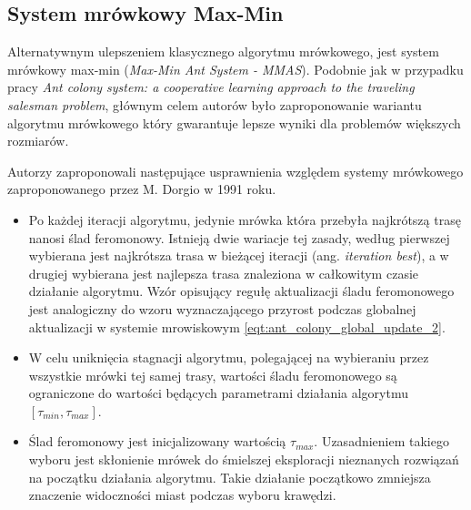 {{        %
        \subsection{System mrówkowy Max-Min}
        {
            Alternatywnym ulepszeniem klasycznego algorytmu mrówkowego, jest system mrówkowy max-min (\textit{Max-Min
            Ant System - MMAS})\cite{Sttzle2000MAXMINAS}. Podobnie jak w przypadku pracy \textit{Ant colony system: a
            cooperative learning approach to the traveling salesman problem}\cite{Dorigo1997AntCS}, głównym celem
            autorów było zaproponowanie wariantu algorytmu mrówkowego który gwarantuje lepsze wyniki dla problemów
            większych rozmiarów.

            Autorzy zaproponowali następujące usprawnienia względem systemy mrówkowego zaproponowanego przez M. Dorgio w
            1991 roku.

            \begin{itemize}
                \item Po każdej iteracji algorytmu, jedynie mrówka która przebyła najkrótszą trasę nanosi ślad
                feromonowy. Istnieją dwie wariacje tej zasady, według pierwszej wybierana jest najkrótsza trasa w
                bieżącej iteracji (ang. \textit{iteration best}), a w drugiej wybierana jest najlepsza trasa znaleziona
                w całkowitym czasie działanie algorytmu. Wzór opisujący regułę aktualizacji śladu feromonowego jest
                analogiczny do wzoru wyznaczającego przyrost podczas globalnej aktualizacji w systemie mrowiskowym
                \ref{eqt:ant_colony_global_update_2}.

                \item W celu uniknięcia stagnacji algorytmu, polegającej na wybieraniu przez wszystkie mrówki tej samej
                trasy, wartości śladu feromonowego są ograniczone do wartości będących parametrami działania algorytmu
                $[\tau_{min}, \tau_{max}]$.

                \item Ślad feromonowy jest inicjalizowany wartością $\tau_{max}$. Uzasadnieniem takiego wyboru jest
                skłonienie mrówek do śmielszej eksploracji nieznanych rozwiązań na początku działania algorytmu. Takie
                działanie początkowo zmniejsza znaczenie widoczności miast podczas wyboru krawędzi.
            \end{itemize}
        }
    }

}
